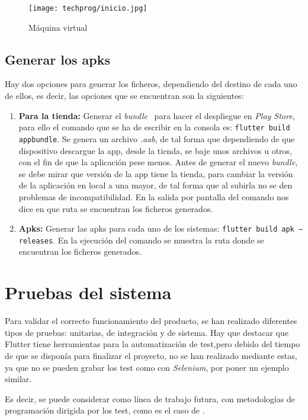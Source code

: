 \begin{figure}[H]
	\centering
	\texttt{[image: techprog/inicio.jpg]}
	\caption{Máquina virtual}\label{fig:run}
\end{figure}

\subsection{Generar los apks}
Hay dos opciones para generar los ficheros, dependiendo del destino de cada uno de ellos, es decir, las opciones que se encuentran son la siguientes:
\begin{enumerate}
	\item \textbf{Para la tienda:} Generar el \emph{bundle}~\cite{wiki:bundle} para hacer el despliegue en \emph{Play Store}, para ello el comando que se ha de escribir en la consola es: \texttt{flutter build appbundle}. Se genera un archivo \emph{.aab}, de tal forma que dependiendo de que dispositivo descargue la app, desde la tienda, se baje unos archivos u otros, con el fin de que la aplicación pese menos.  Antes de generar el nuevo \emph{bundle}, se debe mirar que versión de la app tiene la tienda, para cambiar la versión de la aplicación en local a una mayor, de tal forma que al subirla no se den problemas de incompatibilidad. En la salida por pantalla del comando nos dice en que ruta se encuentran los ficheros generados.
	\item \textbf{Apks:} Generar las apks para cada uno de los sistemas: \texttt{flutter build apk --releases}. En la ejecución del comando se muestra la ruta donde se encuentran los ficheros generados.
\end{enumerate} 

\section{Pruebas del sistema}
Para validar el correcto funcionamiento del producto, se han realizado diferentes tipos de pruebas: unitarias, de integración y de sistema. Hay que destacar que Flutter tiene herramientas para la automatización de test,pero debido del tiempo de que se disponía para finalizar el proyecto, no se han realizado mediante estas, ya que no se pueden grabar los test como con \emph{Selenium}, por poner un ejemplo similar. 

Es decir, se puede considerar como línea de trabajo futura, con metodologías de programación dirigida por los test, como es el caso de .

